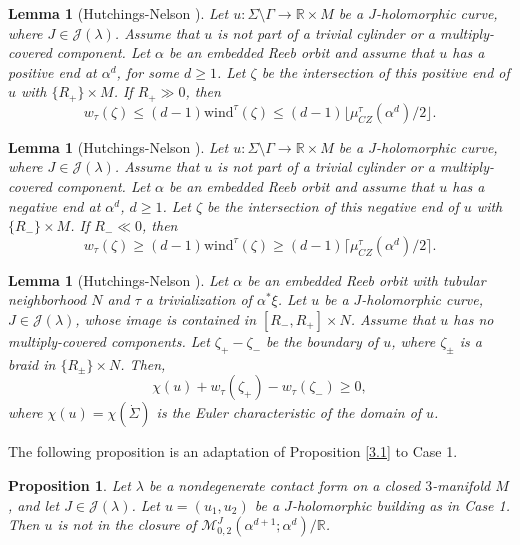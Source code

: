 \documentclass{amsart}
\newcommand{\R}{\mathbb{R}}
\newcommand{\M}{\mathcal{M}}
\newtheorem{lemma}[theorem]{Lemma}
\newtheorem{prop}[theorem]{Proposition}
\newcommand{\CZ}{\mu_{CZ}^{\tau}}
\newcommand{\wind}{\text{wind}^{\tau}}
\begin{document}
\begin{lemma}[Hutchings-Nelson {\cite[Lemma 3.2]{HN}}] \label{L3.2} 
Let $u:\Sigma \setminus \Gamma \to \R \times M$ be a $J$-holomorphic curve, where $J \in \mathcal{J}(\lambda)$. Assume that $u$ is not part of a trivial cylinder or a multiply-covered component. Let $\alpha$ be an embedded Reeb orbit and assume that $u$ has a positive end at $\alpha^d$, for some $d\geq 1$. Let $\zeta$ be the intersection of this positive end of $u$ with $\{R_{+}\}\times M$. If $R_{+} \gg 0$, then
$$w_{\tau}(\zeta) \leq (d-1)\wind(\zeta) \leq (d-1)\lfloor\CZ(\alpha^d)/2\rfloor.$$ 
\end{lemma}

\begin{lemma}[Hutchings-Nelson {\cite[Lemma 3.3]{HN}}] \label{L3.4} 
Let $u:\Sigma \setminus \Gamma \to \R \times M$ be a $J$-holomorphic curve, where $J \in \mathcal{J}(\lambda)$. Assume that $u$ is not part of a trivial cylinder or a multiply-covered component.
Let $\alpha$ be an embedded Reeb orbit and assume that $u$ has a negative end at $\alpha^d$, $d\geq 1$. Let $\zeta$ be the intersection of this negative end of $u$ with $\{R_{-}\}\times M$. If $R_{-} \ll 0$, then
$$w_{\tau}(\zeta) \geq (d-1)\wind(\zeta) \geq (d-1)\lceil\CZ(\alpha^d)/2\rceil.$$ 
\end{lemma}

\begin{lemma}[Hutchings-Nelson {\cite[Lemma 3.5]{HN}}] \label{L3.5} 
Let $\alpha$ be an embedded Reeb orbit with tubular neighborhood $N$ and $\tau$ a trivialization of $\alpha^*\xi$. Let $u$ be a $J$-holomorphic curve, $J \in \mathcal{J}(\lambda)$, whose image is contained in $[R_{-},R_{+}]\times N$. Assume that $u$ has no multiply-covered components. Let $\zeta_{+}-\zeta_{-}$ be the boundary of $u$, where $\zeta_{\pm}$ is a braid in $\{R_{\pm}\}\times N$. Then,
$$\chi(u)+w_{\tau}(\zeta_{+})-w_{\tau}(\zeta_{-}) \geq 0,$$
where $\chi(u)=\chi(\dot \Sigma)$ is the Euler characteristic of the domain of $u$.
\end{lemma}

The following proposition is an adaptation of Proposition \ref{3.1} to Case 1.

\begin{prop} \label{naopode1} 
Let $\lambda$ be a nondegenerate contact form on a closed $3$-manifold $M$,  and let $J \in \mathcal{J}(\lambda)$. Let $u=(u_1,u_2)$ be a $J$-holomorphic building as in Case 1. Then $u$ is not in the closure of $\M_{0,2}^J(\alpha^{d+1 };\alpha^d)/\R$.
\end{prop}
\end{document}
